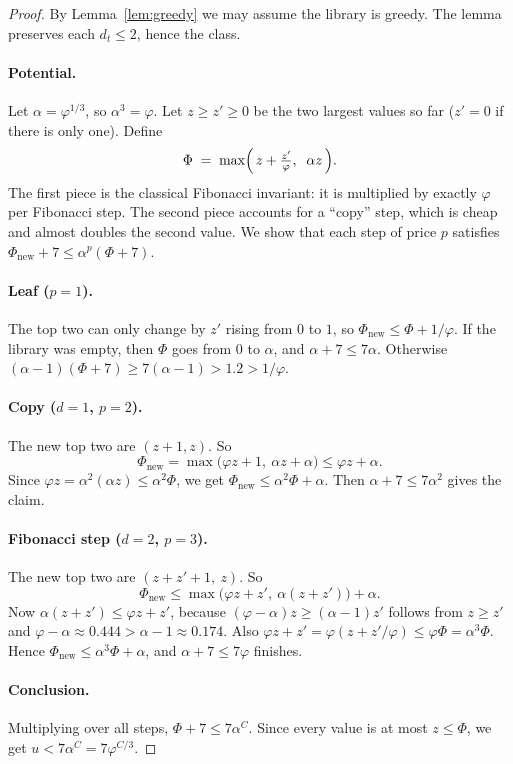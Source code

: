 \documentclass[11pt]{article}
\theoremstyle{remark}
\begin{document}
\begin{proof}
By Lemma~\ref{lem:greedy} we may assume the library is greedy. The lemma preserves each
$d_t\le2$, hence the class.

\paragraph{Potential.} Let $\alpha=\varphi^{1/3}$, so $\alpha^3=\varphi$. Let $z\ge z'\ge0$
be the two largest values so far ($z'=0$ if there is only one). Define
\[
\Phi \;=\; \max\Bigl(\,z+\tfrac{z'}{\varphi},\;\; \alpha z\,\Bigr).
\]
The first piece is the classical Fibonacci invariant: it is multiplied by exactly
$\varphi$ per Fibonacci step. The second piece accounts for a ``copy'' step, which is
cheap and almost doubles the second value. We show that each step of price $p$ satisfies
$\Phi_{\text{new}}+7\le\alpha^{p}(\Phi+7)$.

\paragraph{Leaf ($p=1$).} The top two can only change by $z'$ rising from $0$ to $1$,
so $\Phi_{\text{new}}\le\Phi+1/\varphi$. If the library was empty, then $\Phi$ goes from
$0$ to $\alpha$, and $\alpha+7\le7\alpha$. Otherwise
$(\alpha-1)(\Phi+7)\ge 7(\alpha-1)>1.2>1/\varphi$.

\paragraph{Copy ($d=1$, $p=2$).} The new top two are $(z+1,z)$. So
\[
\Phi_{\text{new}}=\max\bigl(\varphi z+1,\ \alpha z+\alpha\bigr)\le \varphi z+\alpha .
\]
Since $\varphi z=\alpha^2(\alpha z)\le\alpha^2\Phi$, we get
$\Phi_{\text{new}}\le\alpha^2\Phi+\alpha$. Then $\alpha+7\le 7\alpha^2$ gives the claim.

\paragraph{Fibonacci step ($d=2$, $p=3$).} The new top two are $(z+z'+1,\ z)$. So
\[
\Phi_{\text{new}}\le\max\bigl(\varphi z+z',\ \alpha(z+z')\bigr)+\alpha .
\]
Now $\alpha(z+z')\le\varphi z+z'$, because $(\varphi-\alpha)z\ge(\alpha-1)z'$ follows from
$z\ge z'$ and $\varphi-\alpha\approx0.444>\alpha-1\approx0.174$. Also
$\varphi z+z'=\varphi(z+z'/\varphi)\le\varphi\Phi=\alpha^3\Phi$. Hence
$\Phi_{\text{new}}\le\alpha^3\Phi+\alpha$, and $\alpha+7\le7\varphi$ finishes.

\paragraph{Conclusion.} Multiplying over all steps,
$\Phi+7\le 7\alpha^{C}$. Since every value is at most $z\le\Phi$, we get
$u<7\alpha^C=7\varphi^{C/3}$.
\end{proof}
\end{document}
